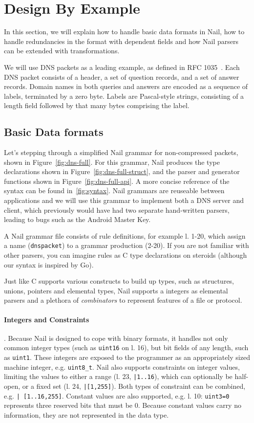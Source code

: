 \section{Design By Example}
In this section, we will explain how to handle basic data formats in Nail, how to handle
redundancies in the format with dependent fields and how Nail parsers can be extended with
transformations. 

We will use DNS packets as a leading example, as defined in RFC 1035~\cite[\S4]{RFC:1035}.  Each DNS packet consists of a
header, a set of question records, and a set of answer records. Domain
names in both queries and answers are encoded as a sequence of labels,
terminated by a zero byte.  Labels are Pascal-style strings, consisting
of a length field followed by that many bytes comprising the label.
\label{s:design}
\subsection{Basic Data formats}

Let's stepping through a simplified Nail grammar for non-compressed
packets, shown in  Figure~\ref{fig:dns-full}.  For this grammar, Nail produces the type declarations
shown in Figure~\ref{fig:dns-full-struct}, and the parser and
generator functions shown in Figure~\ref{fig:dns-full-api}. A more concise reference of the syntax
can be found in~\ref{fig:syntax}.
Nail grammars are reuseable between applications and we will use this grammar to implement
both a DNS server and client, which previously would have had two separate hand-written parsers,
leading to bugs such as  the Android Master Key. 

A Nail grammar file consists of rule definitions, for example l. 1-20,  which assign a name
(\texttt{dnspacket}) to a grammar production (2-20). If you are not familiar with
other parsers, you can imagine rules as C type declarations on steroids
(although our syntax is inspired by Go).

Just like C supports various constructs to build up types, such as structures, unions, pointers and
elemental types, Nail supports a integers as elemental parsers and a plethora of \emph{combinators}
to represent features of a file or protocol. 

\paragraph{Integers and Constraints}.
Because Nail is designed to cope with binary formats,
it handles not only common integer types (such as \texttt{uint16} on l. 16), but bit fields of any
length, such as \texttt{uint1}. These integers are exposed to the programmer as an appropriately
sized machine integer, e.g. \texttt{uint8\_t}. Nail also supports constraints on integer values,
limiting the values to either a range (l. 23, \texttt{|1..16}), which can optionally be half-open,
or a fixed set (l. 24, \texttt{|[1,255]}). Both types of constraint can be combined, e.g. \texttt{|
  [1..16,255]}. Constant values are also supported, e.g. l. 10: \texttt{uint3=0} represents
three reserved bits that must be 0. Because constant values carry no information, they are not
represented in the data type.

